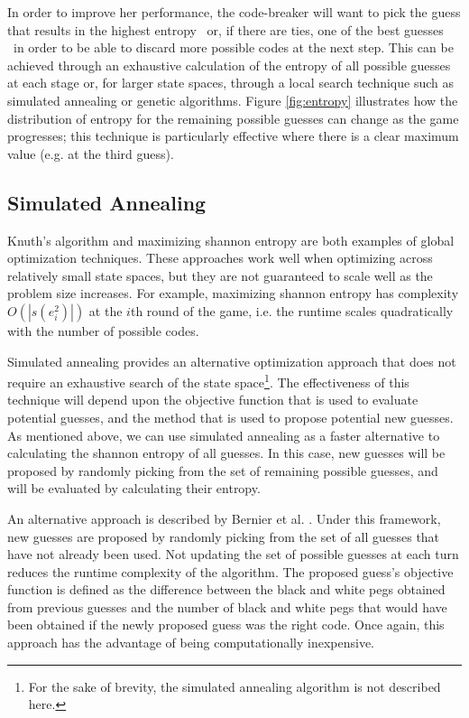 \documentclass[11pt]{article}
\begin{document}
In order to improve her performance, the code-breaker will want to pick the guess that results in the highest entropy \textendash \ or, if there are ties, one of the best guesses \textendash \ in order to be able to discard more possible codes at the next step. This can be achieved through an exhaustive calculation of the entropy of all possible guesses at each stage or, for larger state spaces, through a local search technique such as simulated annealing or genetic algorithms.  Figure \ref{fig:entropy} illustrates how the distribution of entropy for the remaining possible guesses can change as the game progresses; this technique is particularly effective where there is a clear maximum value (e.g. at the third guess).

\subsection{Simulated Annealing}

Knuth's algorithm and maximizing shannon entropy are both examples of global optimization techniques. These approaches work well when optimizing across relatively small state spaces, but they are not guaranteed to scale well as the problem size increases. For example, maximizing shannon entropy has complexity $O(|s(e_i^2)|)$ at the $i$th round of the game, i.e. the runtime scales quadratically with the number of possible codes.

Simulated annealing provides an alternative optimization approach that does not require an exhaustive search of the state space\footnote{For the sake of brevity, the simulated annealing algorithm is not described here.}. The effectiveness of this technique will depend upon the objective function that is used to evaluate potential guesses, and the method that is used to propose potential new guesses. As mentioned above, we can use simulated annealing as a faster alternative to calculating the shannon entropy of all guesses. In this case, new guesses will be proposed by randomly picking from the set of remaining possible guesses, and will be evaluated by calculating their entropy.

An alternative approach is described by Bernier et al. \cite{bernier1996solving}. Under this framework, new guesses are proposed by randomly picking from the set of all guesses that have not already been used. Not updating the set of possible guesses at each turn reduces the runtime complexity of the algorithm. The proposed guess's objective function is defined as the difference between the black and white pegs obtained from previous guesses and the number of black and white pegs that would have been obtained if the newly proposed guess was the right code. Once again, this approach has the advantage of being computationally inexpensive.
\end{document}
